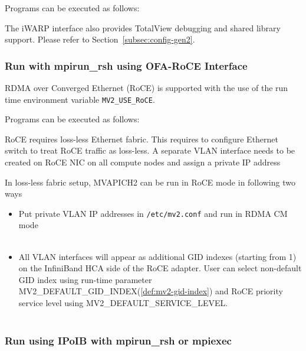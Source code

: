 Programs can be executed as follows:


The iWARP interface also provides TotalView debugging and shared library
support. Please refer to Section~\ref{subsec:config-gen2}.


\subsubsection{Run with mpirun\_rsh using OFA-RoCE Interface}
\label{subsec:mpi-roce}

RDMA over Converged Ethernet (RoCE) is supported with the use of the run
time environment variable \texttt{MV2\_USE\_RoCE}.

Programs can be executed as follows:


RoCE requires loss-less Ethernet fabric. This requires to configure Ethernet switch to
treat RoCE traffic as loss-less. A separate VLAN interface needs to be created on
RoCE NIC on all compute nodes and assign a private IP address

In loss-less fabric setup, MVAPICH2 can be run in RoCE mode in following two ways
\begin{itemize}
    \item Put private VLAN IP addresses in \texttt{/etc/mv2.conf} and run in RDMA CM mode \\
        \\
    \item All VLAN interfaces will appear as additional GID indexes (starting from 1) on
            the InfiniBand HCA side of the RoCE adapter. User can select non-default
            GID index using run-time parameter \\ MV2\_DEFAULT\_GID\_INDEX(\ref{def:mv2-gid-index})
            and RoCE priority service level using MV2\_DEFAULT\_SERVICE\_LEVEL. \\
         \\
\end{itemize}

\subsubsection{Run using IPoIB with mpirun\_rsh or mpiexec}

